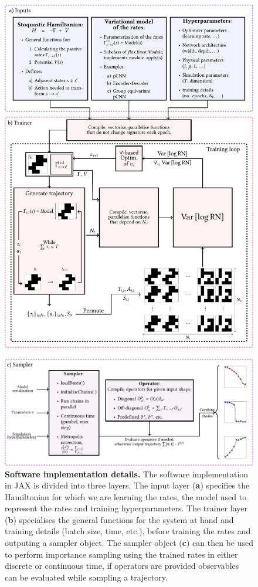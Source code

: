 \begin{enumerate}[label=\roman*)]
	\begin{figure}[H]
		\centering
		\includegraphics[width=\linewidth]{Chapter4/Figs/Vector/qsampl1}
	\end{figure}
	\begin{figure}[t!]
		\ContinuedFloat
		\centering
		\includegraphics[width=\linewidth]{Chapter4/Figs/Vector/qsampl2}
		\caption[Implementation details]{\textbf{Software implementation details.} The software implementation in JAX is divided into three layers. The input layer (\textbf{a}) specifies the Hamiltonian for which we are learning the rates, the model used to represent the rates and training hyperparameters. The trainer layer (\textbf{b}) specialises the general functions for the system at hand and training details (batch size, time, etc.), before training the rates and outputing a sampler object. The sampler object (\textbf{c}) can then be used to perform importance sampling using the trained rates in either discrete or continuous time, if operators are provided observables can be evaluated while sampling a trajectory.}

\end{figure}
\end{enumerate}
